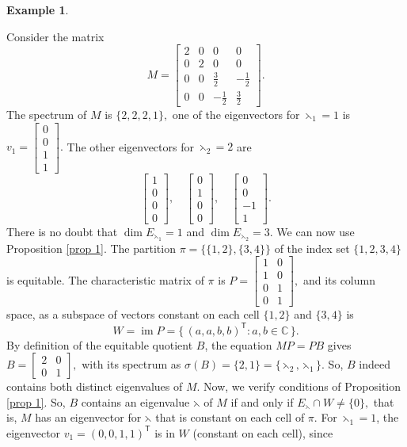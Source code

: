 \documentclass[12pt,twoside]{article}
\newtheorem{example}[theorem]{Example}
\begin{document}
\begin{example}\label{ex:equitable-M}\end{example}
	Consider the matrix
	$$
	M =
	\begin{bmatrix}
		2 & 0 & 0 & 0 \\
		0 & 2 & 0 & 0 \\
		0 & 0 & \tfrac32 & -\tfrac12 \\
		0 & 0 & -\tfrac12 & \tfrac32
	\end{bmatrix}.
	$$
	The spectrum of $M$ is $\{2,2,2,1\},$ one of the eigenvectors for $\leftthreetimes_1=1$ is $v_1=\begin{bmatrix}0\\0\\1\\1\end{bmatrix}.$ The other eigenvectors for $\leftthreetimes_2=2$ are
	$$
	\begin{bmatrix}1\\0\\0\\0\end{bmatrix},\quad
	\begin{bmatrix}0\\1\\0\\0\end{bmatrix},\quad
	\begin{bmatrix}0\\0\\-1\\1\end{bmatrix}.
	$$
	There is no doubt that $\dim E_{\leftthreetimes_1}=1$ and $\dim E_{\leftthreetimes_2}=3$. We can now use Proposition \ref{prop 1}.
	The partition $\pi=\{\{1,2\},\{3,4\}\}$ of the index set $\{1,2,3,4\}$ is equitable.   The characteristic matrix of $\pi$ is $P=
	\begin{bmatrix}
		1 & 0\\
		1 & 0\\
		0 & 1\\
		0 & 1
	\end{bmatrix},$ and its column space, as a subspace of vectors constant on each cell $\{1,2\}$ and $\{3,4\}$ is
	$$
	W=\operatorname{im}P
	=\{\,(a,a,b,b)^{\mathsf T}: a,b\in\mathbb{C}\,\}.
	$$
	By definition of the equitable quotient $B$, the equation $MP = PB$ gives  $B=
	\begin{bmatrix}
		2 & 0\\
		0 & 1
	\end{bmatrix},$
	with its spectrum as  $\sigma(B)=\{2,1\}=\{\leftthreetimes_2,\leftthreetimes_1\}.$ 	So, $B$ indeed contains both distinct eigenvalues of $M$. Now, we  verify conditions of Proposition \ref{prop 1}. So,  $B$ contains an eigenvalue $\leftthreetimes$ of $M$ if and only if $E_\leftthreetimes\cap W\neq\{0\},$ that is, $M$ has an eigenvector for $\leftthreetimes$ that is constant on each cell of $\pi$. For $\leftthreetimes_1=1$, the eigenvector $v_1=(0,0,1,1)^{\mathsf T}$ is in $W$ (constant on each cell), since
\end{document}
